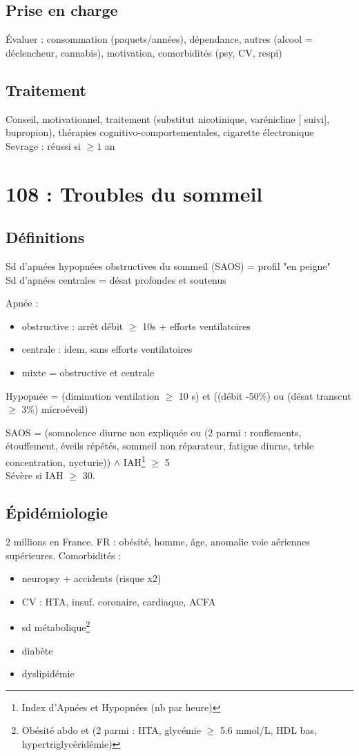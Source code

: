 \documentclass{article}
\begin{document}
\subsection{Prise en charge}
Évaluer : consommation (paquets/années), dépendance, autres (alcool = déclencheur,
cannabis), motivation, comorbidités (psy, CV, respi)
\subsection{Traitement}
Conseil, motivationnel, traitement (substitut nicotinique, varénicline [\danger
suivi], bupropion), thérapies cognitivo-comportementales, cigarette
électronique\\
Sevrage : réussi si \(\ge 1\) an


\section{108 : Troubles du sommeil}
\subsection{Définitions}
\danger Sd d'apnées hypopnées obstructives du sommeil (SAOS) = profil "en peigne"\\
Sd d'apnées centrales = désat profondes et soutenus

Apnée : 
\begin{itemize}
\item obstructive : arrêt débit \(\ge\) 10s + efforts ventilatoires
\item centrale : idem, sans efforts ventilatoires
\item mixte = obstructive et centrale
\end{itemize}
Hypopnée = (diminution ventilation \(\ge\) 10 s) et ((débit -50\%) ou (désat
transcut \(\ge\) 3\%) \textpm{} microéveil)

SAOS = (somnolence diurne non expliquée ou (2 parmi : ronflements, étouffement,
éveils répétés, sommeil non réparateur, fatigue diurne, trble concentration,
nycturie)) \(\wedge{}\)  IAH\footnote{Index d'Apnées et Hypopnées (nb par heure)} \(\ge\) 5\\
Sévère si IAH \(\ge\) 30.
\subsection{Épidémiologie}
2 millions en France.
FR : obésité, homme, âge, anomalie voie aériennes supérieures. 
Comorbidités :
\begin{itemize}
\item neuropsy + accidents (risque x2)
\item CV : HTA, insuf. coronaire, cardiaque, ACFA
\item sd métabolique\footnote{Obésité abdo et (2 parmi : HTA, glycémie \(\ge\) 5.6 mmol/L,
    HDL bas, hypertriglycéridémie)}
\item diabète
\item dyslipidémie
\end{itemize}
\end{document}

